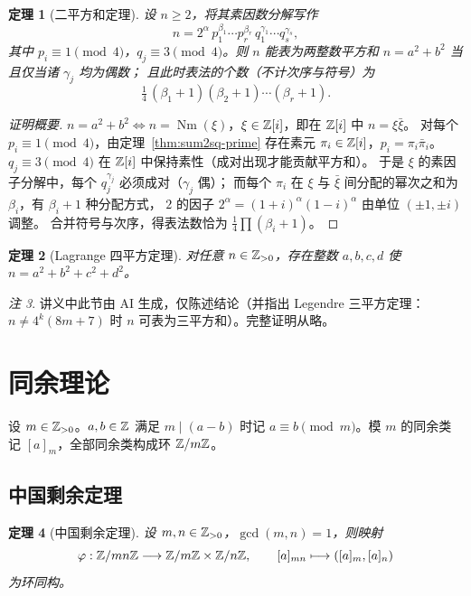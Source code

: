 \documentclass{article}
\newcommand{\Nm}{\operatorname{Nm}}
\theoremstyle{plain}
\newtheorem{thm}{定理}[section]
\theoremstyle{definition}
\theoremstyle{remark}
\newtheorem{rem}[thm]{注}
\begin{document}
\begin{thm}[二平方和定理]\label{thm:sum2sq}
  设 $n\ge2$，将其素因数分解写作
  \[
    n=2^\alpha\,p_1^{\beta_1}\cdots p_r^{\beta_r}\,q_1^{\gamma_1}\cdots q_s^{\gamma_s},
  \]
  其中 $p_i\equiv1\pmod4$，$q_j\equiv3\pmod4$。则 $n$ 能表为两整数平方和 $n=a^2+b^2$ 当且仅当诸 $\gamma_j$ 均为偶数；
  且此时表法的个数（不计次序与符号）为
  \[
    \tfrac14\,(\beta_1+1)(\beta_2+1)\cdots(\beta_r+1).
  \]
\end{thm}

\begin{proof}[证明概要]
  $n=a^2+b^2\iff n=\Nm(\xi)$，$\xi\in\mathbb{Z}[i]$，即在 $\mathbb{Z}[i]$ 中 $n=\xi\bar\xi$。
  对每个 $p_i\equiv1\pmod4$，由定理~\ref{thm:sum2sq-prime} 存在素元 $\pi_i\in\mathbb{Z}[i]$，$p_i=\pi_i\bar\pi_i$。
  $q_j\equiv3\pmod4$ 在 $\mathbb{Z}[i]$ 中保持素性（成对出现才能贡献平方和）。
  于是 $\xi$ 的素因子分解中，每个 $q_j^{\gamma_j}$ 必须成对（$\gamma_j$ 偶）；
  而每个 $\pi_i$ 在 $\xi$ 与 $\bar\xi$ 间分配的幂次之和为 $\beta_i$，有 $\beta_i+1$ 种分配方式，
  $2$ 的因子 $2^\alpha=(1+i)^\alpha(1-i)^\alpha$ 由单位 $(\pm1,\pm i)$ 调整。
  合并符号与次序，得表法数恰为 $\tfrac14\prod(\beta_i+1)$。
\end{proof}

\begin{thm}[Lagrange 四平方定理]\label{thm:lagrange}
  对任意 $n\in\mathbb{Z}_{>0}$，存在整数 $a,b,c,d$ 使 $n=a^2+b^2+c^2+d^2$。
\end{thm}

\begin{rem}
  讲义中此节由 AI 生成，仅陈述结论（并指出 Legendre 三平方定理：$n\ne4^k(8m+7)$ 时 $n$ 可表为三平方和）。完整证明从略。
\end{rem}

\section{同余理论}

设 $m\in\mathbb{Z}_{>0}$。$a,b\in\mathbb{Z}$ 满足 $m\mid(a-b)$ 时记 $a\equiv b\pmod m$。模 $m$ 的同余类记 $[a]_m$，全部同余类构成环 $\mathbb{Z}/m\mathbb{Z}$。

\subsection{中国剩余定理}

\begin{thm}[中国剩余定理]\label{thm:CRT}
  设 $m,n\in\mathbb{Z}_{>0}$，$\gcd(m,n)=1$，则映射
  \[
    \varphi:\mathbb{Z}/mn\mathbb{Z}\longrightarrow\mathbb{Z}/m\mathbb{Z}\times\mathbb{Z}/n\mathbb{Z},\qquad [a]_{mn}\longmapsto([a]_m,[a]_n)
  \]
  为环同构。
\end{thm}
\end{document}
